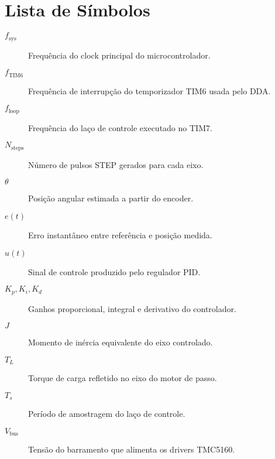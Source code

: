 \chapter*{Lista de Símbolos}

\begin{description}
    \item[$f_{\text{sys}}$] \quad Frequência do clock principal do microcontrolador.
    \item[$f_{\text{TIM6}}$] \quad Frequência de interrupção do temporizador TIM6 usada pelo DDA.
    \item[$f_{\text{loop}}$] \quad Frequência do laço de controle executado no TIM7.
    \item[$N_{\text{steps}}$] \quad Número de pulsos STEP gerados para cada eixo.
    \item[$\theta$] \quad Posição angular estimada a partir do encoder.
    \item[$e(t)$] \quad Erro instantâneo entre referência e posição medida.
    \item[$u(t)$] \quad Sinal de controle produzido pelo regulador PID.
    \item[$K_p, K_i, K_d$] \quad Ganhos proporcional, integral e derivativo do controlador.
    \item[$J$] \quad Momento de inércia equivalente do eixo controlado.
    \item[$T_L$] \quad Torque de carga refletido no eixo do motor de passo.
    \item[$T_s$] \quad Período de amostragem do laço de controle.
    \item[$V_{\text{bus}}$] \quad Tensão do barramento que alimenta os drivers TMC5160.
\end{description}
